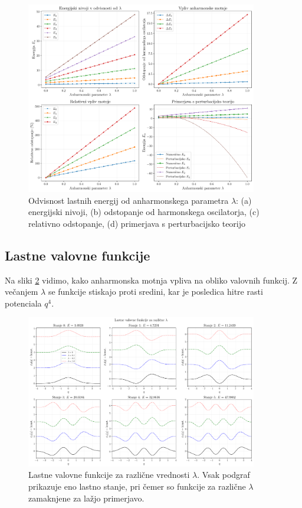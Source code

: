 \documentclass[12pt,a4paper]{article}
\begin{document}
\begin{figure}[ht]
    \centering
    \includegraphics[width=0.9\textwidth]{anharmonic_oscillator_plots/02_odvisnost_od_lambda.pdf}
    \caption{Odvisnost lastnih energij od anharmonskega parametra $\lambda$: (a) energijski nivoji, (b) odstopanje od harmonskega oscilatorja, (c) relativno odstopanje, (d) primerjava s perturbacijsko teorijo}
    \label{fig:odvisnost_lambda}
\end{figure}

\newpage

\subsection{Lastne valovne funkcije}

Na sliki \ref{fig:valovne_funkcije} vidimo, kako anharmonska motnja vpliva na obliko valovnih funkcij. 
Z večanjem $\lambda$ se funkcije stiskajo proti sredini, kar je posledica hitre rasti potenciala $q^4$.

\begin{figure}[hb]
    \centering
    \includegraphics[width=0.9\textwidth]{anharmonic_oscillator_plots/03_valovne_funkcije.pdf}
    \caption{Lastne valovne funkcije za različne vrednosti $\lambda$. Vsak podgraf prikazuje eno lastno stanje, pri čemer so funkcije za različne $\lambda$ zamaknjene za lažjo primerjavo.}
    \label{fig:valovne_funkcije}
\end{figure}
\end{document}

